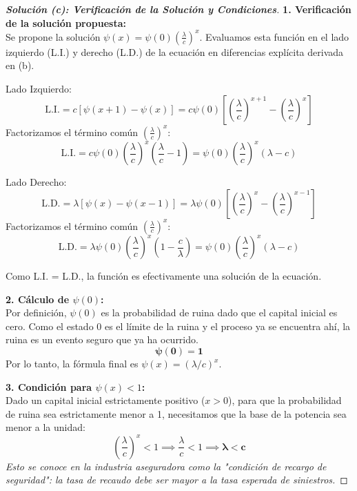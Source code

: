 \documentclass[10pt,a4paper]{article}
\begin{document}
\begin{proof}[\textbf{Solución (c): Verificación de la Solución y Condiciones}]
    \textbf{1. Verificación de la solución propuesta:} \\
    Se propone la solución $\psi(x) = \psi(0) \left(\frac{\lambda}{c}\right)^x$. Evaluamos esta función en el lado izquierdo (L.I.) y derecho (L.D.) de la ecuación en diferencias explícita derivada en (b).
    
    Lado Izquierdo:
    \[ \text{L.I.} = c[\psi(x+1) - \psi(x)] = c \psi(0) \left[ \left(\frac{\lambda}{c}\right)^{x+1} - \left(\frac{\lambda}{c}\right)^x \right] \]
    Factorizamos el término común $\left(\frac{\lambda}{c}\right)^x$:
    \[ \text{L.I.} = c \psi(0) \left(\frac{\lambda}{c}\right)^x \left( \frac{\lambda}{c} - 1 \right) = \psi(0) \left(\frac{\lambda}{c}\right)^x (\lambda - c) \]
    
    Lado Derecho:
    \[ \text{L.D.} = \lambda[\psi(x) - \psi(x-1)] = \lambda \psi(0) \left[ \left(\frac{\lambda}{c}\right)^x - \left(\frac{\lambda}{c}\right)^{x-1} \right] \]
    Factorizamos el término común $\left(\frac{\lambda}{c}\right)^x$:
    \[ \text{L.D.} = \lambda \psi(0) \left(\frac{\lambda}{c}\right)^x \left( 1 - \frac{c}{\lambda} \right) = \psi(0) \left(\frac{\lambda}{c}\right)^x (\lambda - c) \]
    
    Como L.I. = L.D., la función es efectivamente una solución de la ecuación.

    \vspace{3mm}
    \textbf{2. Cálculo de $\psi(0)$:} \\
    Por definición, $\psi(0)$ es la probabilidad de ruina dado que el capital inicial es cero. Como el estado $0$ es el límite de la ruina y el proceso ya se encuentra ahí, la ruina es un evento seguro que ya ha ocurrido.
    \[ \mathbf{\psi(0) = 1} \]
    Por lo tanto, la fórmula final es $\psi(x) = (\lambda/c)^x$.

    \vspace{3mm}
    \textbf{3. Condición para $\psi(x) < 1$:} \\
    Dado un capital inicial estrictamente positivo ($x > 0$), para que la probabilidad de ruina sea estrictamente menor a 1, necesitamos que la base de la potencia sea menor a la unidad:
    \[ \left(\frac{\lambda}{c}\right)^x < 1 \implies \frac{\lambda}{c} < 1 \implies \mathbf{\lambda < c} \]
    \textit{Esto se conoce en la industria aseguradora como la "condición de recargo de seguridad": la tasa de recaudo debe ser mayor a la tasa esperada de siniestros.}
\end{proof}
\end{document}
